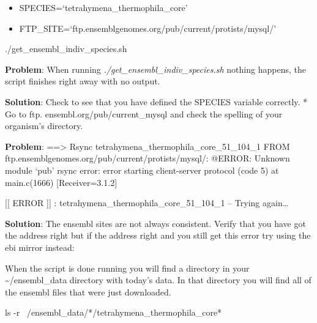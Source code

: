 \documentclass[]{book}
\newenvironment{Shaded}{\begin{snugshade}}{\end{snugshade}}
\newcommand{\FunctionTok}[1]{\textcolor[rgb]{0.00,0.00,0.00}{#1}}
\newcommand{\ExtensionTok}[1]{#1}
\newcommand{\NormalTok}[1]{#1}
\providecommand{\tightlist}{%
  \setlength{\itemsep}{0pt}\setlength{\parskip}{0pt}}
\newenvironment{rmdblock}[1]
  {\begin{shaded*}
  \begin{itemize}
  \renewcommand{\labelitemi}{
    \raisebox{-.7\height}[0pt][0pt]{
      {\setkeys{Gin}{width=3em,keepaspectratio}\texttt{[image: images/\#1]}}
    }
  }
  \item
  }
  {
  \end{itemize}
  \end{shaded*}
  }
\newenvironment{rmd-troubleshooting}
  {\begin{rmdblock}{troubleshooting}}
  {\end{rmdblock}}
\begin{document}
\begin{itemize}
\tightlist
\item
  SPECIES=`tetrahymena\_thermophila\_core'
\item
  FTP\_SITE=`ftp.ensemblgenomes.org/pub/current/protists/mysql/'
\end{itemize}

\begin{Shaded}
\begin{Highlighting}[]
\ExtensionTok{./get_ensembl_indiv_species.sh} 
\end{Highlighting}
\end{Shaded}

\begin{rmd-troubleshooting}
\textbf{Problem}: When running \emph{./get\_ensembl\_indiv\_species.sh}
nothing happens, the script finishes right away with no output.

\textbf{Solution}: Check to see that you have defined the SPECIES
variable correctly. * Go to ftp. ensembl.org/pub/current\_mysql and
check the spelling of your organism's directory.
\end{rmd-troubleshooting}

\begin{rmd-troubleshooting}
\textbf{Problem}: ==\textgreater{} Rsync
tetrahymena\_thermophila\_core\_51\_104\_1 FROM
ftp.ensemblgenomes.org/pub/current/protists/mysql/: @ERROR: Unknown
module `pub' rsync error: error starting client-server protocol (code 5)
at main.c(1666) {[}Receiver=3.1.2{]}

{[}{[} ERROR {]}{]} : tetrahymena\_thermophila\_core\_51\_104\_1 --
Trying again\ldots{}

\textbf{Solution}: The ensembl sites are not always consistent. Verify
that you have got the address right but if the address right and you
still get this error try using the ebi mirror instead:
\end{rmd-troubleshooting}

When the script is done running you will find a directory in your
\textasciitilde{}/ensembl\_data directory with today's data. In that
directory you will find all of the ensembl files that were just
downloaded.

\begin{Shaded}
\begin{Highlighting}[]
\FunctionTok{ls}\NormalTok{ -r ~/ensembl_data/*/tetrahymena_thermophila_core*}
\end{Highlighting}
\end{Shaded}
\end{document}
